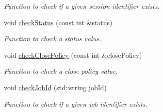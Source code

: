 \begin{DoxyCompactItemize}
\begin{DoxyCompactList}\small\item\em Function to check if a given session identifier exists. \item\end{DoxyCompactList}\item 
void \hyperlink{classQueryServer_a358f371f74bcb2dd3e789bd20d0cb672}{checkStatus} (const int \&status)
\begin{DoxyCompactList}\small\item\em Function to check a status value. \item\end{DoxyCompactList}\item 
void \hyperlink{classQueryServer_a73cc37f1e18f4e5028d8f4d68b9b148f}{checkClosePolicy} (const int \&closePolicy)
\begin{DoxyCompactList}\small\item\em Function to check a close policy value. \item\end{DoxyCompactList}\item 
void \hyperlink{classQueryServer_add7b3dc1799367f27cf0160a5ac63ecf}{checkJobId} (std::string jobId)
\begin{DoxyCompactList}\small\item\em Function to check if a given job identifier exists. \item\end{DoxyCompactList}\end{DoxyCompactItemize}
